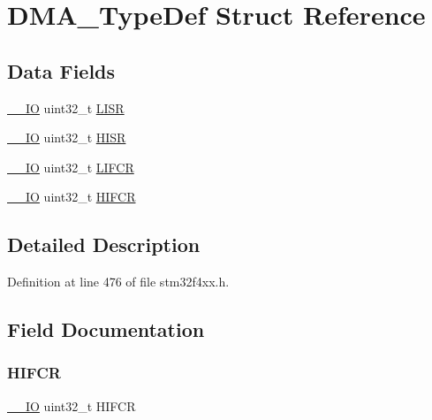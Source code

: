 \hypertarget{struct_d_m_a___type_def}{}\section{D\+M\+A\+\_\+\+Type\+Def Struct Reference}
\label{struct_d_m_a___type_def}
\subsection*{Data Fields}
\begin{DoxyCompactItemize}
\item 
\hyperlink{group___c_m_s_i_s__core__definitions_gaec43007d9998a0a0e01faede4133d6be}{\+\_\+\+\_\+\+IO} uint32\+\_\+t \hyperlink{struct_d_m_a___type_def_a5cdef358e9e95b570358e1f6a3a7f492}{L\+I\+SR}
\item 
\hyperlink{group___c_m_s_i_s__core__definitions_gaec43007d9998a0a0e01faede4133d6be}{\+\_\+\+\_\+\+IO} uint32\+\_\+t \hyperlink{struct_d_m_a___type_def_a6fe40f7ac1a18c2726b328b5ec02b262}{H\+I\+SR}
\item 
\hyperlink{group___c_m_s_i_s__core__definitions_gaec43007d9998a0a0e01faede4133d6be}{\+\_\+\+\_\+\+IO} uint32\+\_\+t \hyperlink{struct_d_m_a___type_def_ac4f7bf4cb172024bfc940c00167cd04e}{L\+I\+F\+CR}
\item 
\hyperlink{group___c_m_s_i_s__core__definitions_gaec43007d9998a0a0e01faede4133d6be}{\+\_\+\+\_\+\+IO} uint32\+\_\+t \hyperlink{struct_d_m_a___type_def_ac55c27aeea4107813c1e7da3fcf46961}{H\+I\+F\+CR}
\end{DoxyCompactItemize}


\subsection{Detailed Description}


Definition at line 476 of file stm32f4xx.\+h.



\subsection{Field Documentation}
\mbox{\label{struct_d_m_a___type_def_ac55c27aeea4107813c1e7da3fcf46961}} 
\subsubsection{\texorpdfstring{H\+I\+F\+CR}{HIFCR}}
{\footnotesize\ttfamily \hyperlink{group___c_m_s_i_s__core__definitions_gaec43007d9998a0a0e01faede4133d6be}{\+\_\+\+\_\+\+IO} uint32\+\_\+t H\+I\+F\+CR}

